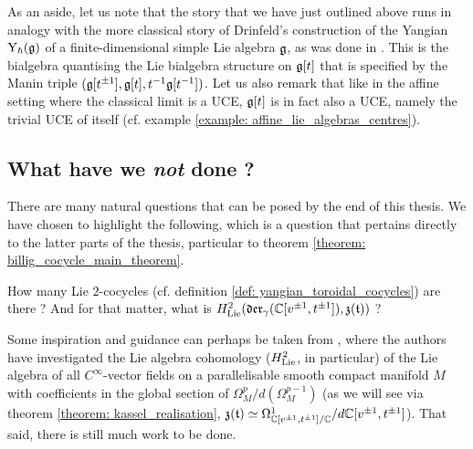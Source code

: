         As an aside, let us note that the story that we have just outlined above runs in analogy with the more classical story of Drinfeld's construction of the Yangian $\mathrm{Y}_{\hbar}(\mathfrak{g})$ of a finite-dimensional simple Lie algebra $\mathfrak{g}$, as was done in \cite{drinfeld_original_yangian_paper}. This is the bialgebra quantising the Lie bialgebra structure on $\mathfrak{g}[t]$ that is specified by the Manin triple $(\mathfrak{g}[t^{\pm 1}], \mathfrak{g}[t], t^{-1}\mathfrak{g}[t^{-1}])$. Let us also remark that like in the affine setting where the classical limit is a UCE, $\mathfrak{g}[t]$ is in fact also a UCE, namely the trivial UCE of itself (cf. example \ref{example: affine_lie_algebras_centres}).

    \subsection{What have we \textit{not} done ?}
        There are many natural questions that can be posed by the end of this thesis. We have chosen to highlight the following, which is a question that pertains directly to the latter parts of the thesis, particular to theorem \ref{theorem: billig_cocycle_main_theorem}.
        \begin{question}
            How many  Lie $2$-cocycles (cf. definition \ref{def: yangian_toroidal_cocycles}) are there ? And for that matter, what is $H^2_{\mathrm{Lie}}(\mathfrak{der}_{\gamma}(\mathbb{C}[v^{\pm 1}, t^{\pm 1}]), \mathfrak{z}(\mathfrak{t}))$ ?
        \end{question}
        Some inspiration and guidance can perhaps be taken from \cite{billig_neeb_vector_field_cyclic_cohomology_parallelisable_manifolds}, where the authors have investigated the Lie algebra cohomology ($H^2_{\mathrm{Lie}}$, in particular) of the Lie algebra of all $C^{\infty}$-vector fields on a parallelisable smooth compact manifold $M$ with coefficients in the global section of $\Omega^p_M/d( \Omega^{p - 1}_M )$ (as we will see via theorem \ref{theorem: kassel_realisation}, $\mathfrak{z}(\mathfrak{t}) \simeq \Omega^1_{ \mathbb{C}[v^{\pm 1}, t^{\pm 1}]/\mathbb{C} }/d \mathbb{C}[v^{\pm 1}, t^{\pm 1}]$). That said, there is still much work to be done.

